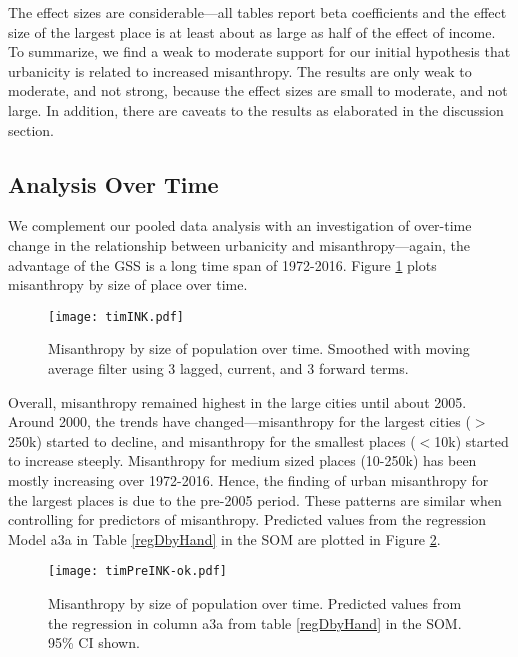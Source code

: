 \documentclass[11pt, letterpaper]{article}
\begin{document}
\begin{spacing}{1.4}
The effect sizes are considerable---all tables report beta coefficients
and the effect size of the largest place is at least about as large as half of the effect
of income.  To summarize, we find a weak to moderate support for our initial
hypothesis that urbanicity is related to increased misanthropy. The results are
only weak to moderate, and not strong, because the effect sizes are small to
moderate, and not large. In addition, there are caveats to the results as elaborated in the discussion section.

\subsection*{Analysis Over Time}

We complement our pooled data analysis with an investigation of over-time change
in the relationship between urbanicity and misanthropy---again, the advantage of the GSS
is a long time span of 1972-2016. Figure \ref{tim} plots misanthropy by size of
place over time.

\begin{figure}[H]
  \texttt{[image: timINK.pdf]}\centering
\caption{Misanthropy by size of population over time. Smoothed with moving average filter using 3 lagged, current, and 3 forward terms.}\label{tim}%
\end{figure}

Overall, misanthropy remained highest in the large cities until
about 2005. Around 2000, the trends have changed---misanthropy for the largest
cities ($>$250k) started to decline, and misanthropy for the smallest places
($<$10k) started to increase steeply. Misanthropy for medium
sized places (10-250k) has been mostly increasing over 1972-2016. Hence, the
finding of urban misanthropy for the largest places is due to the pre-2005 period.
%
These patterns are similar when controlling for predictors of
misanthropy. Predicted values from the regression Model a3a in Table \ref{regDbyHand} in
the SOM are plotted in Figure \ref{timPre}. 


\begin{figure}[H]
  \texttt{[image: timPreINK-ok.pdf]}\centering
\caption{Misanthropy by size of population over time. Predicted values from the regression in column a3a from table \ref{regDbyHand} in the SOM. 95\% CI shown.}\label{timPre}%
\end{figure}


\end{spacing}
\end{document}
